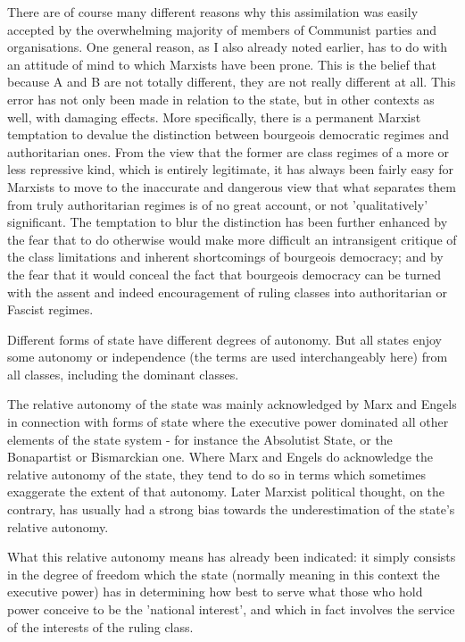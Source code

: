 There are of course many different reasons why this assimilation was easily accepted by the overwhelming majority of members of Communist parties and organisations. One general reason, as I also already noted earlier, has to do with an attitude of mind to which Marxists have been prone. This is the belief that because A and B are not totally different, they are not really different at all. This error has not only been made in relation to the state, but in other contexts as well, with damaging effects. More specifically, there is a permanent Marxist temptation to devalue the distinction between bourgeois democratic regimes and authoritarian ones. From the view that the former are class regimes of a more or less repressive kind, which is entirely legitimate, it has always been fairly easy for Marxists to move to the inaccurate and dangerous view that what separates them from truly authoritarian regimes is of no great account, or not 'qualitatively' significant. The temptation to blur the distinction has been further enhanced by the fear that to do otherwise would make more difficult an intransigent critique of the class limitations and inherent shortcomings of bourgeois democracy; and by the fear that it would conceal the fact that bourgeois democracy can be turned with the assent and indeed encouragement of ruling classes into authoritarian or Fascist regimes.

Different forms of state have different degrees of autonomy. But all states enjoy some autonomy or independence (the terms are used interchangeably here) from all classes, including the dominant classes.

The relative autonomy of the state was mainly acknowledged by Marx and Engels in connection with forms of state where the executive power dominated all other elements of the state system - for instance the Absolutist State, or the Bonapartist or Bismarckian one. Where Marx and Engels do acknowledge the relative autonomy of the state, they tend to do so in terms which sometimes exaggerate the extent of that autonomy. Later Marxist political thought, on the contrary, has usually had a strong bias towards the underestimation of the state's relative autonomy.

What this relative autonomy means has already been indicated: it simply consists in the degree of freedom which the state (normally meaning in this context the executive power) has in determining how best to serve what those who hold power conceive to be the 'national interest', and which in fact involves the service of the interests of the ruling class.

